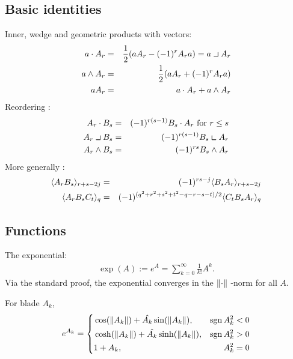 \documentclass[a4paper,12pt]{article}
\begin{document}
\subsection{Basic identities}

Inner, wedge and geometric products with vectors\cite{CA2GC}:
\begin{eqnarray}
a\cdot A_r &=& \frac{1}{2}(a A_r - (-1)^r A_r a) = a\linner A_r\\
a\wedge A_r &=& \frac{1}{2}(a A_r + (-1)^r A_r a)\\
a A_r &=& a \cdot A_r + a \wedge A_r
\end{eqnarray}
Reordering \cite{CA2GC, Chisolm:2012aa}:
\begin{eqnarray}
 A_r\cdot B_s &=& (-1)^{r(s-1)} B_s \cdot A_r\ \textrm{for}\ r \leq s\\
 A_r\linner B_s &=& (-1)^{r(s-1)} B_s \rinner A_r\\
 A_r\wedge B_s &=& (-1)^{rs} B_s \wedge A_r\\
\end{eqnarray}
More generally \cite{CA2GC, Chisolm:2012aa}:
\begin{eqnarray}
 \grade{r+s-2j}{A_r B_s} &=& (-1)^{rs - j} \grade{r + s - 2j}{B_s A_r}\\
 \grade{q}{A_r B_s C_t} &=& (-1)^{(q^2 + r^2 + s^2 + t^2 - q - r - s - t)/2} \grade{q}{C_t B_s A_r}
\end{eqnarray}

\subsection{Functions}

The exponential:
\begin{align}
\label{eq:expdef}
\exp(A) := e^{A} =  \sum_{k = 0}^\infty \frac{1}{k!} A^k.
\end{align}
Via the standard proof, the exponential converges in the $\norm{\cdot}$ -norm for all $A$.

For blade $A_k$,
\begin{align}
\label{eq:bladeexptrig}
e^{A_k} = \left\{\begin{aligned}
	 &\cos(\norm{A_k}) + \normed{A_k} \sin(\norm{A_k}), &\sign{A_k^2} < 0&\\
	&\cosh(\norm{A_k}) + \normed{A_k} \sinh(\norm{A_k}), &\sign{A_k^2} > 0&\\
	&1 + A_k, &A_k^2 = 0&
	\end{aligned} \right.
\end{align}
\end{document}
